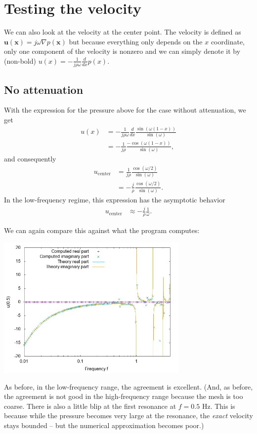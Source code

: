 \documentclass{article}
\begin{document}
\section{Testing the velocity}

We can also look at the velocity at the center point. The velocity is
defined as $\mathbf u(\mathbf x)=j\omega \nabla p(\mathbf x)$ but
because everything only depends on the $x$ coordinate, only one
component of the velocity is nonzero and we can simply denote it by
(non-bold) $u(x)=-\frac{1}{j\rho\omega}\frac{d}{dx} p(x)$.

\subsection{No attenuation}

With the expression for the pressure above for the case without
attenuation, we get
\begin{align*}
  u(x)
  &=
  -\frac{1}{j\rho\omega} \frac{d}{dx} \frac{\sin(\omega(1-x))}{\sin(\omega)}
  \\
  &=
  -\frac{1}{j\rho} \frac{-\cos(\omega(1-x))}{\sin(\omega)},
\end{align*}
and consequently
\begin{align*}
  u_\text{center}
  &=
  \frac{1}{j\rho} \frac{\cos(\omega/2)}{\sin(\omega)}
  \\
  &=
  -\frac{j}{\rho} \frac{\cos(\omega/2)}{\sin(\omega)}.
\end{align*}
In the low-frequency regime, this expression has the asymptotic behavior
\begin{align*}
  u_\text{center}
  &\approx
  -\frac{j}{\rho} \frac{1}{\omega}.
\end{align*}


We can again compare this against what the program computes:
\begin{center}
\includegraphics[width=0.7\textwidth]{unit-cube/no-attenuation/velocity-at-center.png}
\end{center}
As before, in the low-frequency range, the agreement is
excellent. (And, as before, the agreement is not good in the
high-frequency range because the mesh is too coarse. There is also a
little blip at the first resonance at $f=0.5$ Hz. This is because
while the pressure becomes very large at the resonance, the
\textit{exact} velocity stays bounded -- but the numerical
approximation becomes poor.)
\end{document}
